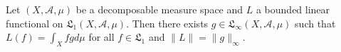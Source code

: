 Let $(X, \mathcal{A}, \mu)$ be a decomposable measure space and $L$ a bounded linear functional on $\mathfrak{L}_1(X, \mathcal{A}, \mu)$. Then there exists $g \in \mathfrak{L}_{\infty}(X, \mathcal{A}, \mu)$ such that $L(f) = \int_X f g d\mu$ for all $f \in \mathfrak{L}_1$ and $\|L\| = \|g\|_{\infty}$.
